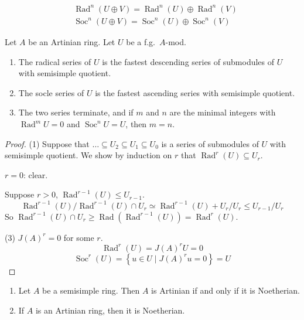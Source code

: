 \documentclass[11pt, a4paper]{report}
\begin{document}
\begin{lemma}
\[
\begin{aligned}
& \operatorname{Rad}^{n}(U \oplus V)=\operatorname{Rad}^{n}(U) \oplus \operatorname{Rad}^{n}(V) \\
& \operatorname{Soc}^{n}(U \oplus V)=\operatorname{Soc}^{n}(U) \oplus \operatorname{Soc}^{n}(V)
\end{aligned}
\]
\end{lemma}

\begin{theorem}
Let $A$ be an Artinian ring. Let $U$ be a f.g.\ $A$-mod.
\begin{enumerate}
\item The radical series of $U$ is the fastest descending series of submodules of $U$ with semisimple quotient.
\item The socle series of $U$ is the fastest ascending series with semisimple quotient.
\item The two series terminate, and if $m$ and $n$ are the minimal integers with $\operatorname{Rad}^{m} U=0$ and $\operatorname{Soc}^{n} U=U$, then $m=n$.
\end{enumerate}
\end{theorem}

\begin{proof}
(1) Suppose that $\ldots \subseteq U_{2} \subseteq U_{1} \subseteq U_{0}$ is a series of submodules of $U$ with semisimple quotient. We show by induction on $r$ that $\operatorname{Rad}^{r}(U) \subseteq U_{r}$.

$r=0$: clear.

Suppose $r>0$, $\operatorname{Rad}^{r-1}(U) \leqslant U_{r-1}$.
\[
\operatorname{Rad}^{r-1}(U) / \operatorname{Rad}^{r-1}(U) \cap U_{r} \simeq \operatorname{Rad}^{r-1}(U)+U_{r} / U_{r} \leq U_{r-1} / U_{r}
\]
So $\operatorname{Rad}^{r-1}(U) \cap U_{r} \geqslant \operatorname{Rad}\left(\operatorname{Rad}^{r-1}(U)\right)=\operatorname{Rad}^{r}(U)$.

(3) $J(A)^{r}=0$ for some $r$.
\[
\operatorname{Rad}^{r}(U)=J(A)^{r} U=0
\]
\[
\operatorname{Soc}^{r}(U)=\left\{u \in U \mid J(A)^{r} u=0\right\}=U
\]
\end{proof}

\begin{lemma}
\begin{enumerate}
\item Let $A$ be a semisimple ring. Then $A$ is Artinian if and only if it is Noetherian.
\item If $A$ is an Artinian ring, then it is Noetherian.
\end{enumerate}
\end{lemma}
\end{document}

